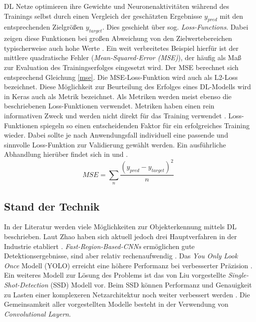 DL Netze optimieren ihre Gewichte und Neuronenaktivitäten während des Trainings selbst durch einen Vergleich der geschätzten Ergebnisse $y_{pred}$ mit den entsprechenden Zielgrößen $y_{target}$. Dies geschieht über sog. \textit{Loss-Functions}. Dabei zeigen diese Funktionen bei großen Abweichung von den Zielwertebereichen typischerweise auch hohe Werte \cite[S.271-279]{Goodfellow-et-al-2016}. Ein weit verbreitetes Beispiel hierfür ist der mittlere quadratische Fehler (\textit{Mean-Squared-Error (MSE)}), der häufig als Maß zur Evaluation des Trainingserfolges eingesetzt wird. Der MSE berechnet sich entsprechend Gleichung \ref{mse}. Die MSE-Loss-Funktion wird auch als L2-Loss bezeichnet. Diese Möglichkeit zur Beurteilung des Erfolges eines DL-Modells wird in Keras auch als Metrik bezeichnet. Als Metriken werden meist ebenso die beschriebenen Loss-Funktionen verwendet. Metriken haben einen rein informativen Zweck und werden nicht direkt für das Training verwendet \cite{chollet2015keras}. Loss-Funktionen spiegeln so einen entscheidenden Faktor für ein erfolgreiches Training wieder. Dabei sollte je nach Anwendungsfall individuell eine passende und sinnvolle Loss-Funktion zur Validierung gewählt werden. Ein ausführliche Abhandlung hierüber findet sich in \cite{dlbook2018} und \citep{dlazure2019}.
\begin{equation}\label{mse}
	MSE=\sum_{n} \frac{(y_{pred}-y_{target})^2}{n}
\end{equation}

\subsection{Stand der Technik}

In der Literatur werden viele Möglichkeiten zur Objekterkennung mittels DL beschrieben. Laut Zhao haben sich aktuell jedoch drei Hauptverfahren in der Industrie etabliert \cite{Detection2019}. \textit{Fast-Region-Based-CNNs} ermöglichen gute Detektionsergebnisse, sind aber relativ rechenaufwendig \cite{Girshick2015}. Das \textit{You Only Look Once} Modell (YOLO) erreicht eine höhere Performanz bei verbesserter Präzision \cite{Redmon2016}. Ein weiteres Modell zur Lösung des Problems ist das von Liu vorgestellte \textit{Single-Shot-Detection} (SSD) Modell vor. Beim SSD können Performanz und Genauigkeit zu Lasten einer komplexeren Netzarchitektur noch weiter verbessert werden \cite{Liu2016}. Die Gemeinsamkeit aller vorgestellten Modelle besteht in der Verwendung von \textit{Convolutional Layern}.